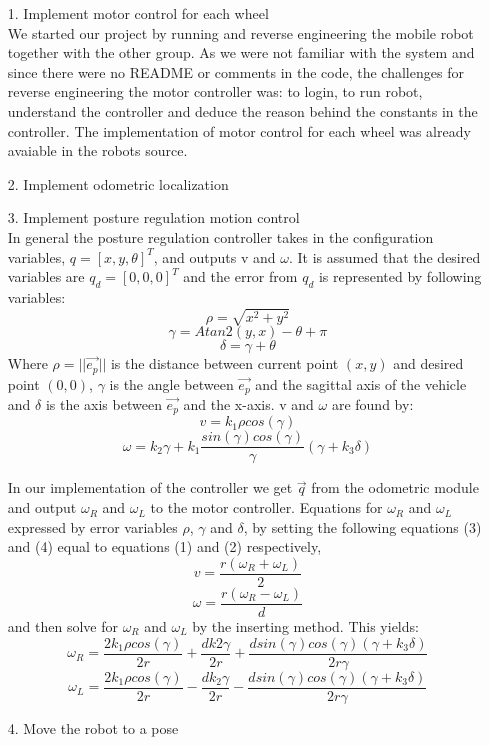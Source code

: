 \documentclass[a4paper,10pt]{article}
\begin{document}
\begin{itemize}
	\item[1.]Implement motor control for each wheel \\
		We started our project by running and reverse engineering the mobile robot together with the other group. 
		As we were not familiar with the system and since there were no README or comments in the code, the challenges for reverse engineering the motor controller was: 
		to login, to run robot, understand the controller and deduce the reason behind the constants in the controller.
		The implementation of motor control for each wheel was already avaiable in the robots source. 
		
	\item[2.]Implement odometric localization
	\item[3.]Implement posture regulation motion control \\
		In general the posture regulation controller takes in the configuration variables, $q = [x, y, \theta]^{T}$, 
		and outputs v and $\omega$.
		It is assumed that the desired variables are $q_{d} = [0, 0, 0]^{T}$ and the error from $q_{d}$ is represented by following variables:
		\[
			\rho = \sqrt{x^{2} + y^{2}} 
		\]\[
			\gamma = Atan2(y, x) - \theta + \pi
		\]\[
			\delta = \gamma + \theta
		\]
		Where $\rho = ||\vec{e_{p}}||$ is the distance between current point $(x, y)$ and desired point $(0, 0)$, 
		$\gamma$ is the angle between $\vec{e_{p}}$	and the sagittal axis of the vehicle and $\delta$ is the axis between $\vec{e_{p}}$ and the x-axis.	
		v and $\omega$ are found by:
		\begin{equation}
			v = k_{1}\rho cos(\gamma)
		\end{equation}		
		\begin{equation}
			\omega = k_{2}\gamma + k_{1}\frac{sin(\gamma)cos(\gamma)}{\gamma}(\gamma + k_{3}\delta)
		\end{equation}
		
		In our implementation of the controller we get $\vec{q}$ from the odometric module and output $\omega_{R}$ and $\omega_{L}$ to the motor controller.
		Equations for $\omega_{R}$ and $\omega_{L}$ expressed by error variables $\rho$, $\gamma$ and $\delta$, 
		by setting the following equations (3) and (4) equal to equations (1) and (2) respectively, 
		\begin{equation}
			v = \frac{r(\omega_{R} + \omega_{L})}{2}
		\end{equation}
		\begin{equation}
			\omega = \frac{r(\omega_{R} - \omega_{L})}{d}
		\end{equation}
		and then solve for $\omega_{R}$ and $\omega_{L}$ by the inserting method. This yields:		
		\begin{equation}
			\omega_{R} = \frac{2k_{1}\rho cos(\gamma)}{2r} + \frac{dk{2}\gamma}{2r} + \frac{dsin(\gamma)cos(\gamma)(\gamma + k_{3}\delta)}{2r\gamma}
		\end{equation}
		\begin{equation}
			\omega_{L} = \frac{2k_{1}\rho cos(\gamma)}{2r} - \frac{dk_{2}\gamma}{2r} - \frac{dsin(\gamma)cos(\gamma)(\gamma + k_{3}\delta)}{2r\gamma}
		\end{equation}
		
	\item[4.]Move the robot to a pose
\end{itemize}
\end{document}
